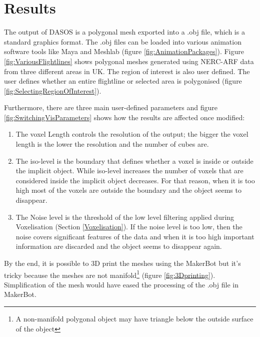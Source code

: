 \documentclass{subfiles}
\begin{document}
\section{Results}\label{sec:MCResults}

\par The output of DASOS is a polygonal mesh exported into a .obj file, which is a standard graphics format. The .obj files can be loaded into various animation software tools like Maya and Meshlab (figure \ref{fig:AnimationPackages}). Figure \ref{fig:VariousFlightlines} shows polygonal meshes generated using NERC-ARF data from three different areas in UK.  The region of interest is also user defined. The user defines whether an entire flightline or selected area is polygonised (figure \ref{fig:SelectingRegionOfInterest}). 

\par Furthermore, there are three main user-defined parameters and figure \ref{fig:SwitchingVisParameters} shows how the results are affected once modified:
\begin{enumerate}
	\item The voxel Length controls the resolution of the output; the bigger the voxel length is the lower the resolution and the number of cubes are.
	\item The iso-level is the boundary that defines whether a voxel is inside or outside the implicit object. While iso-level increases the number of voxels that are considered inside the implicit object decreases. For that reason, when it is too high most of the voxels are outside the boundary and the object seems to disappear.
	\item The Noise level is the threshold of the low level filtering applied during Voxelisation (Section \ref{Voxelisation}). If the noise level is too low, then the noise covers significant features of the data and when it is too high important information are discarded and the object seems to disappear again.
\end{enumerate}  

 
\par By the end, it is possible to 3D print the meshes using the MakerBot but it's tricky because the meshes are not manifold\footnote{ A non-manifold polygonal object may have triangle below the outside surface of the object} (figure \ref{fig:3Dprinting}). Simplification of the mesh would have eased the processing of the .obj file in MakerBot. 
 
\end{document}
